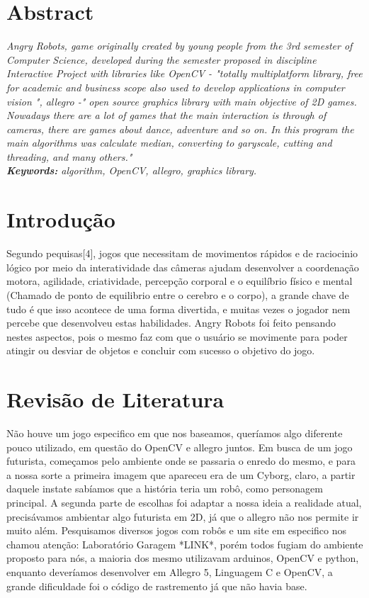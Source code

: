 \documentclass[a4paper]{article}
\begin{document}
\section*{Abstract}

{\it Angry Robots, game originally created by young people from the 3rd semester of Computer Science, developed during the semester proposed in discipline Interactive Project with libraries like OpenCV - "totally multiplatform library, free for academic and business scope also used to develop applications in computer vision ", allegro -" open source graphics library with main objective of 2D games. Nowadays there are a lot of games that the main interaction is through of cameras, there are games about dance, adventure and so on. In this program the main algorithms was calculate median, converting to garyscale, cutting and threading, and many others."\\

{\bf Keywords:} algorithm, OpenCV, allegro, graphics library.} 
\\


\section*{Introdução}

Segundo pequisas[4], jogos que necessitam de movimentos rápidos e
de raciocinio lógico por meio da interatividade das câmeras ajudam
desenvolver a coordenação motora, agilidade, criatividade,
percepção corporal e o equilíbrio físico e mental (Chamado de ponto
de equilibrio entre o cerebro e o corpo), a grande chave de tudo é
que isso acontece de uma forma divertida, e muitas vezes o jogador
nem percebe que desenvolveu estas habilidades. Angry Robots foi
feito pensando nestes aspectos, pois o mesmo faz com que o usuário
se movimente para poder atingir ou desviar de objetos e concluir
com sucesso o objetivo do jogo.
\\
\section*{Revisão de Literatura}

Não houve um jogo especifico em que nos baseamos, queríamos
algo diferente pouco utilizado, em questão do OpenCV e allegro juntos.
Em busca de um jogo futurista, começamos pelo ambiente onde se
passaria o enredo do mesmo, e para a nossa sorte a primeira imagem
que apareceu era de um Cyborg, claro, a partir daquele instate
sabíamos que a história teria um robô, como personagem principal. A
segunda parte de escolhas foi adaptar a nossa ideia a realidade
atual, precisávamos ambientar algo futurista em 2D, já que o
allegro não nos permite ir muito além. Pesquisamos diversos jogos
com robôs e um site em especifico nos chamou atenção: Laboratório
Garagem *LINK*, porém todos fugiam do ambiente proposto para nós, a
maioria dos mesmo utilizavam arduinos, OpenCV e python, enquanto
deveríamos desenvolver em Allegro 5, Linguagem C e OpenCV, a grande
dificuldade foi o código de rastremento já que não havia base.
\\
\end{document}
